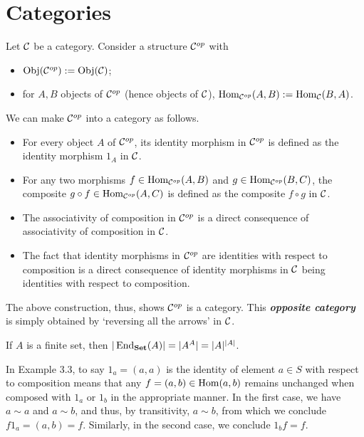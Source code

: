 \section{Categories}
\begin{xca}
Let $\mathcal{C}$ be a category. Consider a structure $\mathcal{C}^{op}$ with
\begin{itemize}
    \item $\operatorname{Obj}(\mathcal{C}^{op}) := \operatorname{Obj}(\mathcal{C})$;
    \item for $A, B$ objects of $\mathcal{C}^{op}$ (hence objects of $\mathcal{C}$),
    $\operatorname{Hom}_{\mathcal{C}^{op}}(A, B) := \operatorname{Hom}_{\mathcal{C}}(B, A)$.
\end{itemize}
We can make $\mathcal{C}^{op}$ into a category as follows.
\begin{itemize}
    \item For every object $A$ of $\mathcal{C}^{op}$, its identity morphism in
    $\mathcal{C}^{op}$ is defined as the identity morphism $1_A$ in $\mathcal{C}$.
    \item For any two morphisms $f \in \operatorname{Hom}_{\mathcal{C}^{op}}(A, B)$ and $g \in
    \operatorname{Hom}_{\mathcal{C}^{op}}(B, C)$, the composite $g \circ f \in
    \operatorname{Hom}_{\mathcal{C}^{op}}(A, C)$ is defined as the composite $f \circ g$ in
    $\mathcal{C}$.
    \item The associativity of composition in $\mathcal{C}^{op}$ is a direct
    consequence of associativity of composition in $\mathcal{C}$.
    \item The fact that identity morphisms in $\mathcal{C}^{op}$ are identities with
    respect to composition is a direct consequence of identity morphisms in
    $\mathcal{C}$ being identities with respect to composition.
\end{itemize}
The above construction, thus, shows $\mathcal{C}^{op}$ is a category. This
\emph{\textbf{opposite category}} is simply obtained by `reversing all the
arrows' in $\mathcal{C}$.
\end{xca}

\begin{xca}
If $A$ is a finite set, then $|\operatorname{End}_{\mathbf{Set}}(A)| = |A^A| = |A|^{|A|}$.
\end{xca}

\begin{xca}
In Example 3.3, to say $1_a = (a, a)$ is the identity of element $a \in S$ with
respect to composition means that any $f = (a, b) \in \operatorname{Hom}(a, b)$ remains
unchanged when composed with $1_a$ or $1_b$ in the appropriate manner. In the
first case, we have $a \sim a$ and $a \sim b$, and thus, by transitivity, $a
\sim b$, from which we conclude $f 1_a = (a, b) = f$. Similarly, in the second
case, we conclude $1_b f = f$.
\end{xca}
